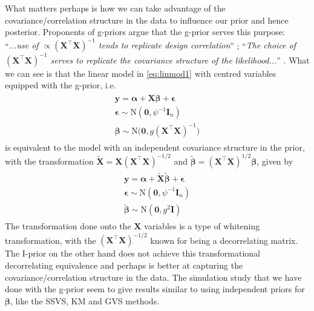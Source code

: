 What matters perhaps is how we can take advantage of the covariance/correlation structure in the data to influence our prior and hence posterior. Proponents of g-priors argue that the g-prior serves this purpose: ``\textit{...use of $\propto (\mathbf X^\top\mathbf X)^{-1}$ tends to replicate design correlation}'' \citep{George1993}; ``\textit{The choice of $(\mathbf X^\top\mathbf X)^{-1}$ serves to replicate the covariance structure of the likelihood...}'' \citep{Chipman2008}. What we can see is that the linear model in \eqref{eq:linmod1} with centred variables equipped with the g-prior, i.e.
\begin{align}
	\begin{gathered}
		\mathbf y = \boldsymbol\alpha + \mathbf X \boldsymbol\beta + \boldsymbol\epsilon \\
        \boldsymbol\epsilon \sim \text{N}(\mathbf 0, \psi^{-1}\mathbf I_n) \\
        \boldsymbol\beta \sim \text{N}\big(\mathbf 0, g(\mathbf X^\top\mathbf X)^{-1}\big)
	\end{gathered}
\end{align}
is equivalent to the model with an independent covariance structure in the prior, with the transformation $\tilde{\mathbf X} = \mathbf X(\mathbf X^\top\mathbf X)^{-1/2}$ and $\tilde{\boldsymbol\beta} = (\mathbf X^\top\mathbf X)^{1/2}\boldsymbol\beta$, given by
\begin{align}
	\begin{gathered}
		\mathbf y = \boldsymbol\alpha + \tilde{\mathbf X} \tilde{\boldsymbol\beta} + \boldsymbol\epsilon \\
        \boldsymbol\epsilon \sim \text{N}(\mathbf 0, \psi^{-1}\mathbf I_n) \\
        \tilde{\boldsymbol\beta} \sim \text{N}(\mathbf 0, g^2 \mathbf I)
	\end{gathered}
\end{align}
The transformation done onto the $\mathbf X$ variables is a type of whitening transformation\footnotemark, with the $(\mathbf X^\top\mathbf X)^{-1/2}$ known for being a decorrelating matrix. The I-prior on the other hand does not achieve this transformational decorrelating equivalence and perhaps is better at capturing the covariance/correlation structure in the data. The simulation study that we have done with the g-prior seem to give results similar to using independent priors for $\boldsymbol\beta$, like the SSVS, KM and GVS methods.



